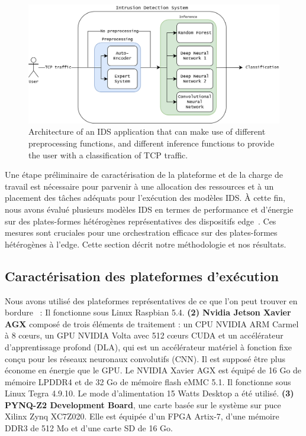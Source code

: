 \begin{figure}[t]
\centering
\includegraphics[width=0.8\columnwidth]{5_Chapitre5/figures/ids-application.png}
\caption{Architecture of an IDS application that can make use of different preprocessing functions, and different inference functions to provide the user with a classification of TCP traffic.}
\label{figure:herocache-ids-application}
\end{figure}

Une étape préliminaire de caractérisation de la plateforme et de la charge de travail est nécessaire pour parvenir à une allocation des ressources et à un placement des tâches adéquats pour l'exécution des modèles IDS. À cette fin, nous avons évalué plusieurs modèles IDS en termes de performance et d'énergie sur des plates-formes hétérogènes représentatives des dispositifs edge~\cite{kljucaric2020}. Ces mesures sont cruciales pour une orchestration efficace sur des plates-formes hétérogènes à l'edge. Cette section décrit notre méthodologie et nos résultats.

\subsection{Caractérisation des plateformes d'exécution} \label{section:herocache-characterization-platforms}

Nous avons utilisé des plateformes représentatives de ce que l'on peut trouver en bordure~\cite{slimani:hal-04159551,kljucaric2020} : 
 Il fonctionne sous Linux Raspbian 5.4.
\textbf{(2) Nvidia Jetson Xavier AGX} composé de trois éléments de traitement : un CPU NVIDIA ARM Carmel à 8 cœurs, un GPU NVIDIA Volta avec 512 cœurs CUDA et un accélérateur d'apprentissage profond (DLA), qui est un accélérateur matériel à fonction fixe conçu pour les réseaux neuronaux convolutifs (CNN). Il est supposé être plus économe en énergie que le GPU. Le NVIDIA Xavier AGX est équipé de 16 Go de mémoire LPDDR4 et de 32 Go de mémoire flash eMMC 5.1. Il fonctionne sous Linux Tegra 4.9.10. Le mode d'alimentation 15 Watts Desktop a été utilisé. 
\textbf{(3) PYNQ-Z2 Development Board}, une carte basée sur le système sur puce Xilinx Zynq XC7Z020. Elle est équipée d'un FPGA Artix-7, d'une mémoire DDR3 de 512 Mo et d'une carte SD de 16 Go.

